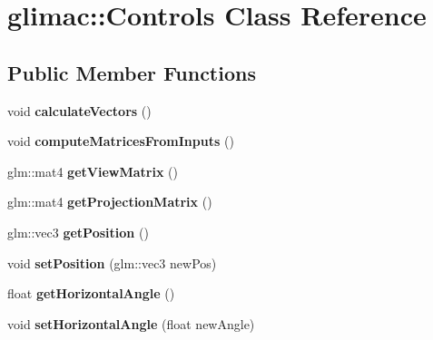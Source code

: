\hypertarget{classglimac_1_1Controls}{}\section{glimac\+:\+:Controls Class Reference}
\label{classglimac_1_1Controls}
\subsection*{Public Member Functions}
\begin{DoxyCompactItemize}
\item 
\mbox{\label{classglimac_1_1Controls_a1937e9b03344764ec2bb608cf5d42f20}} 
void {\bfseries calculate\+Vectors} ()
\item 
\mbox{\label{classglimac_1_1Controls_a3c54964b99d3231ce427ffbff4cd1590}} 
void {\bfseries compute\+Matrices\+From\+Inputs} ()
\item 
\mbox{\label{classglimac_1_1Controls_ac71089c5a9f4f1d78c5bbfeec6fef620}} 
glm\+::mat4 {\bfseries get\+View\+Matrix} ()
\item 
\mbox{\label{classglimac_1_1Controls_aeb14a40e7d273aec1b6095d8bde08437}} 
glm\+::mat4 {\bfseries get\+Projection\+Matrix} ()
\item 
\mbox{\label{classglimac_1_1Controls_a2f0ffddd68aec95f01abf802be75a686}} 
glm\+::vec3 {\bfseries get\+Position} ()
\item 
\mbox{\label{classglimac_1_1Controls_a106c6381601ce5aace8ffdc0b4b7dd95}} 
void {\bfseries set\+Position} (glm\+::vec3 new\+Pos)
\item 
\mbox{\label{classglimac_1_1Controls_ae96ae04755ebbcf8528d8299a637225f}} 
float {\bfseries get\+Horizontal\+Angle} ()
\item 
\mbox{\label{classglimac_1_1Controls_a30b750a3e70f3a273a2abc6bc4932896}} 
void {\bfseries set\+Horizontal\+Angle} (float new\+Angle)
\item 
\mbox{\label{classglimac_1_1Controls_a098df45aa771926c1b25e4ef2cdbf52a}} 

\end{DoxyCompactItemize}
